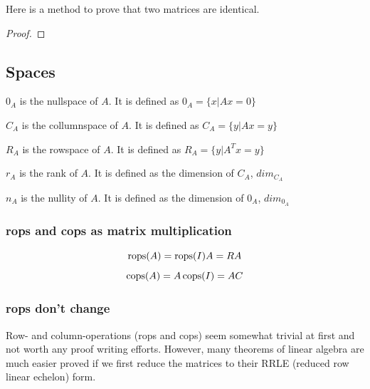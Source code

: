 Here is a method to prove that two matrices are identical. 

\begin{proof}
\end{proof}


\subsection{Spaces}

\begin{definition}[Nullspace]
     $0_A$ is the nullspace of $A$. It is defined as $0_A = \{ x | Ax = 0 \}$
\end{definition}

\begin{definition}[Columnspace]
     $C_A$ is the collumnspace of $A$. It is defined as $C_A = \{ y | Ax = y \}$
\end{definition}

\begin{definition}[Rowspace]
     $R_A$ is the rowspace of $A$. It is defined as $R_A = \{ y | A^Tx = y \}$
\end{definition}

\begin{definition}[Rank]
     $r_A$ is the rank of $A$. It is defined as the dimension of $C_A$, $dim_{C_A}$
\end{definition}

\begin{definition}[Nullity]
    $n_A$ is the nullity of $A$. It is defined as the dimension of $0_A$, $dim_{0_A}$
\end{definition}


\subsubsection  {rops and cops as matrix multiplication}
$$ \operatorname{rops}(A) = \operatorname{rops}(I) A = R A$$
$$ \operatorname{cops}(A) = A \operatorname{cops}(I) = A C$$

\subsubsection{rops don't change }
Row- and column-operations (rops and cops) seem somewhat trivial at first and not worth any proof writing efforts. However, many theorems of linear algebra are much easier proved if we first reduce the matrices to their RRLE (reduced row linear echelon) form.

